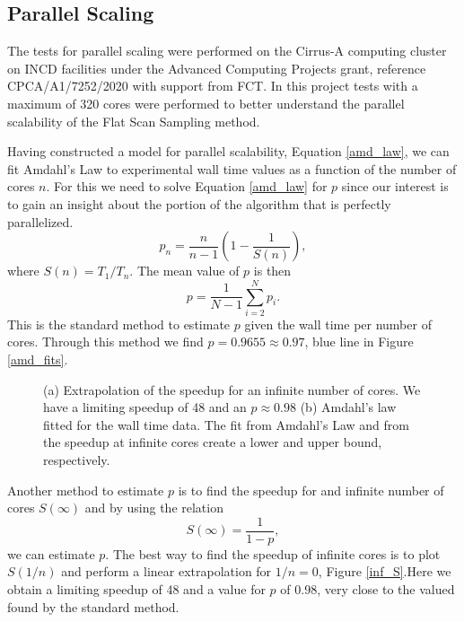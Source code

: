 \subsection{Parallel Scaling}
	
	The tests for parallel scaling were performed on the Cirrus-A computing cluster on INCD facilities under the Advanced Computing Projects grant, reference CPCA/A1/7252/2020 with support from FCT. In this project tests with a maximum of 320 cores were performed to better understand the parallel scalability of the Flat Scan Sampling method.

	Having constructed a model for parallel scalability, Equation \ref{amd_law}, we can fit Amdahl's Law to experimental wall time values as a function of the number of cores $n$. For this we need to solve Equation \ref{amd_law} for $p$ since our interest is to gain an insight about the portion of the algorithm that is perfectly parallelized.
\begin{equation}
	p_n = \frac{n}{n-1} \left( 1 - \frac{1}{S(n)} \right),
\end{equation}
where $S(n) = T_1 / T_n$. The mean value of $p$ is then
\begin{equation}
	p = \frac{1}{N-1} \sum_{i=2}^{N} p_i.
\end{equation}
This is the standard method to estimate $p$ given the wall time per number of cores. Through this method we find  $p=0.9655\approx 0.97$, blue line in Figure \ref{amd_fits}.

\begin{figure}[h]
	\centering
	\caption{(a) Extrapolation of the speedup for an infinite number of cores. We have a limiting speedup of 48 and an $p \approx 0.98$ (b) Amdahl's law fitted for the wall time data. The fit from Amdahl's Law and from the speedup at infinite cores create a lower and upper bound, respectively.}
\end{figure}

\pagebreak

	Another method to estimate $p$ is to find the speedup for and infinite number of cores $S(\infty)$ and by using the relation
\begin{equation}
	S(\infty) = \frac{1}{1-p},
\end{equation}
we can estimate $p$. The best way to find the speedup of infinite cores is to plot $S(1/n)$ and perform a linear extrapolation for $1/n=0$, Figure \ref{inf_S}.Here we obtain a limiting speedup of 48 and a value for $p$ of 0.98, very close to the valued found by the standard method.

